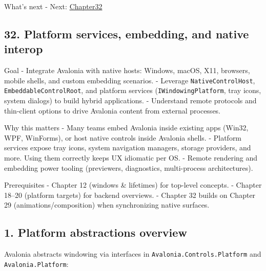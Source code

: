 What's next - Next: \href{Chapter32.md}{Chapter32}

\newpage

\subsection{32. Platform services, embedding, and native
interop}\label{platform-services-embedding-and-native-interop}

Goal - Integrate Avalonia with native hosts: Windows, macOS, X11,
browsers, mobile shells, and custom embedding scenarios. - Leverage
\passthrough{\lstinline!NativeControlHost!},
\passthrough{\lstinline!EmbeddableControlRoot!}, and platform services
(\passthrough{\lstinline!IWindowingPlatform!}, tray icons, system
dialogs) to build hybrid applications. - Understand remote protocols and
thin-client options to drive Avalonia content from external processes.

Why this matters - Many teams embed Avalonia inside existing apps
(Win32, WPF, WinForms), or host native controls inside Avalonia shells.
- Platform services expose tray icons, system navigation managers,
storage providers, and more. Using them correctly keeps UX idiomatic per
OS. - Remote rendering and embedding power tooling (previewers,
diagnostics, multi-process architectures).

Prerequisites - Chapter 12 (windows \& lifetimes) for top-level
concepts. - Chapter 18--20 (platform targets) for backend overviews. -
Chapter 32 builds on Chapter 29 (animations/composition) when
synchronizing native surfaces.

\subsection{1. Platform abstractions
overview}\label{platform-abstractions-overview}

Avalonia abstracts windowing via interfaces in
\passthrough{\lstinline!Avalonia.Controls.Platform!} and
\passthrough{\lstinline!Avalonia.Platform!}:

